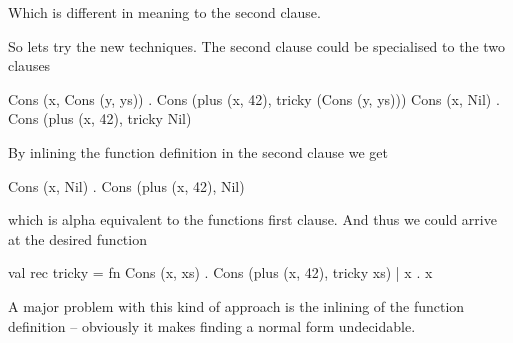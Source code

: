 Which is different in meaning to the second clause.

So lets try the new techniques. The second clause could be specialised to the
two clauses
\begin{sml}
Cons (x, Cons (y, ys)) . Cons (plus (x, 42), tricky (Cons (y, ys)))
Cons (x, Nil)          . Cons (plus (x, 42), tricky Nil)
\end{sml}

By inlining the function definition in the second clause we get

\begin{sml}
Cons (x, Nil)          . Cons (plus (x, 42), Nil)
\end{sml}

which is alpha equivalent to the functions first clause. And thus we could
arrive at the desired function

\begin{sml}
val rec tricky =
fn Cons (x, xs)  . Cons (plus (x, 42), tricky xs)
 | x             . x
\end{sml}

A major problem with this kind of approach is the inlining of the function
definition -- obviously it makes finding a normal form undecidable.

